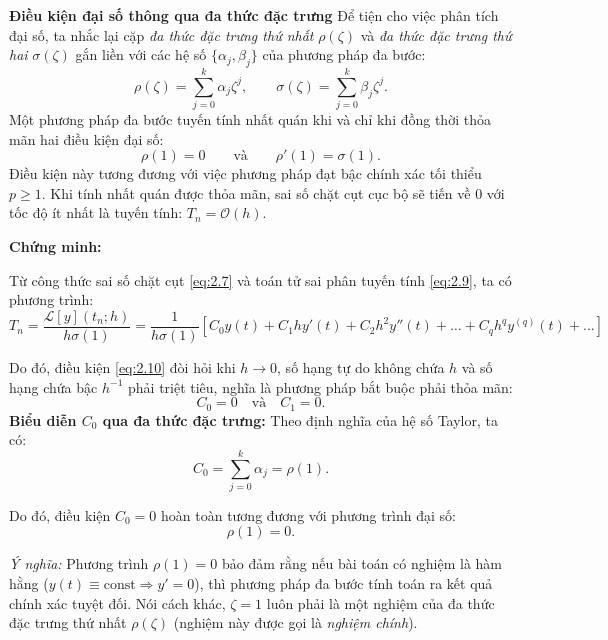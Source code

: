 \vspace{0.5em}
\begin{baitapbox}{\textbf{Điều kiện đại số thông qua đa thức đặc trưng}}
    \noindent Để tiện cho việc phân tích đại số, ta nhắc lại cặp \textit{đa thức đặc trưng thứ nhất} $\rho(\zeta)$ và \textit{đa thức đặc trưng thứ hai} $\sigma(\zeta)$ gắn liền với các hệ số $\{\alpha_j, \beta_j\}$ của phương pháp đa bước:
\begin{equation}
    \rho(\zeta) = \sum_{j=0}^{k} \alpha_j \zeta^j, \qquad \sigma(\zeta) = \sum_{j=0}^{k} \beta_j \zeta^j. \tag{2.11} \label{eq:2.11}
\end{equation}
Một phương pháp đa bước tuyến tính nhất quán khi và chỉ khi đồng thời thỏa mãn hai điều kiện đại số:
\begin{equation}
    \rho(1) = 0 \qquad \text{và} \qquad \rho'(1) = \sigma(1). \tag{2.12} \label{eq:2.12}
\end{equation}
\noindent Điều kiện này tương đương với việc phương pháp đạt bậc chính xác tối thiểu $p \ge 1$. Khi tính nhất quán được thỏa mãn, sai số chặt cụt cục bộ sẽ tiến về $0$ với tốc độ ít nhất là tuyến tính: $T_{n} = \mathcal{O}(h)$.
\end{baitapbox} 

\noindent\textbf{Chứng minh:}

Từ công thức sai số chặt cụt \eqref{eq:2.7} và toán tử sai phân tuyến tính \eqref{eq:2.9}, ta có phương trình:
\[
    T_{n} = \frac{\mathcal{L}[y](t_n; h)}{h \sigma(1)} = \frac{1}{h\sigma(1)}\left[C_0 y(t) + C_1 h y'(t) + C_2 h^2 y''(t) + \dots + C_q h^q y^{(q)}(t) +...\right]
\]


Do đó, điều kiện \eqref{eq:2.10} đòi hỏi khi $h \to 0$, số hạng tự do không chứa $h$ và số hạng chứa bậc $h^{-1}$ phải triệt tiêu, nghĩa là phương pháp bắt buộc phải thỏa mãn:
\[
    C_0 = 0 \quad \text{và} \quad C_1 = 0. 
\]
\noindent\textbf{Biểu diễn $C_0$ qua đa thức đặc trưng:} Theo định nghĩa của hệ số Taylor, ta có:
    \[
        C_0 = \sum_{j=0}^{k} \alpha_j = \rho(1).
    \]

Do đó, điều kiện $C_0 = 0$ hoàn toàn tương đương với phương trình đại số:
\begin{equation}
      \rho(1) = 0. \tag{2.13} \label{eq:2.13}
\end{equation}

\textit{Ý nghĩa:} Phương trình $\rho(1) = 0$ bảo đảm rằng nếu bài toán có nghiệm là hàm hằng ($y(t) \equiv \text{const} \Rightarrow y' = 0$), thì phương pháp đa bước tính toán ra kết quả chính xác tuyệt đối. Nói cách khác, $\zeta = 1$ luôn phải là một nghiệm của đa thức đặc trưng thứ nhất $\rho(\zeta)$ (nghiệm này được gọi là \textit{nghiệm chính}).\\

